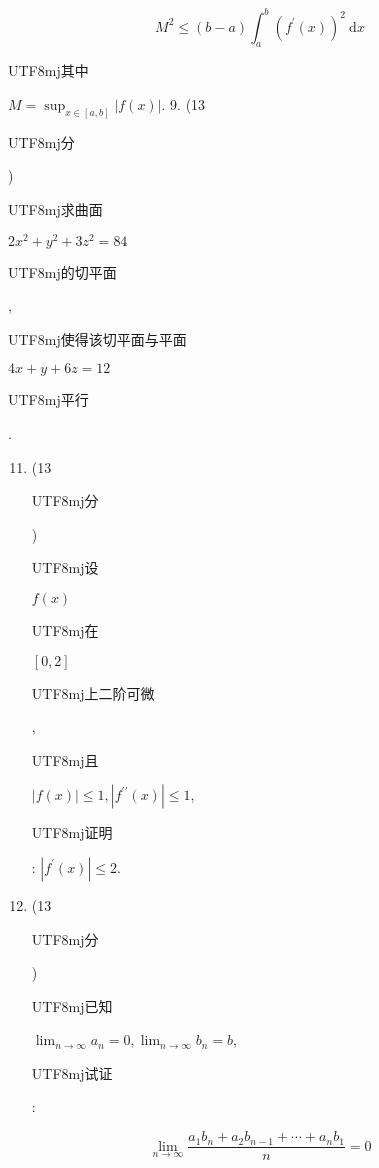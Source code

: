 \documentclass[10pt]{article}
\begin{document}
$$
M^{2} \leq(b-a) \int_{a}^{b}\left(f^{\prime}(x)\right)^{2} \mathrm{~d} x
$$
\begin{CJK}{UTF8}{mj}其中\end{CJK} $M=\sup _{x \in[a, b]}|f(x)|$. 9. (13 \begin{CJK}{UTF8}{mj}分\end{CJK}) \begin{CJK}{UTF8}{mj}求曲面\end{CJK} $2 x^{2}+y^{2}+3 z^{2}=84$ \begin{CJK}{UTF8}{mj}的切平面\end{CJK}, \begin{CJK}{UTF8}{mj}使得该切平面与平面\end{CJK} $4 x+y+6 z=12$ \begin{CJK}{UTF8}{mj}平行\end{CJK}.

\begin{enumerate}
  \setcounter{enumi}{10}
  \item (13 \begin{CJK}{UTF8}{mj}分\end{CJK}) \begin{CJK}{UTF8}{mj}设\end{CJK} $f(x)$ \begin{CJK}{UTF8}{mj}在\end{CJK} $[0,2]$ \begin{CJK}{UTF8}{mj}上二阶可微\end{CJK}, \begin{CJK}{UTF8}{mj}且\end{CJK} $|f(x)| \leq 1,\left|f^{\prime \prime}(x)\right| \leq 1$, \begin{CJK}{UTF8}{mj}证明\end{CJK}: $\left|f^{\prime}(x)\right| \leq 2$.

  \item (13 \begin{CJK}{UTF8}{mj}分\end{CJK}) \begin{CJK}{UTF8}{mj}已知\end{CJK} $\lim _{n \rightarrow \infty} a_{n}=0, \lim _{n \rightarrow \infty} b_{n}=b$, \begin{CJK}{UTF8}{mj}试证\end{CJK}:

\end{enumerate}
$$
\lim _{n \rightarrow \infty} \frac{a_{1} b_{n}+a_{2} b_{n-1}+\cdots+a_{n} b_{1}}{n}=0
$$
\end{document}
